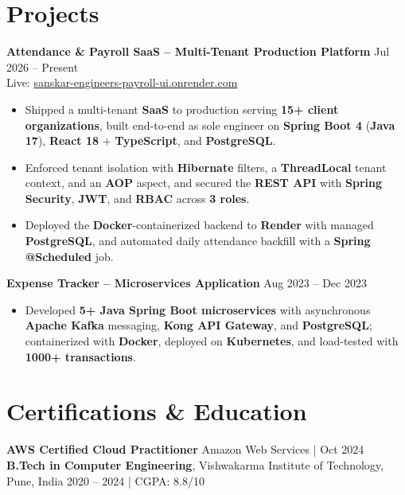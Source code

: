 \documentclass[a4paper,10pt]{article}
\begin{document}
\section*{Projects}

\textbf{Attendance \& Payroll SaaS -- Multi-Tenant Production Platform} \hfill Jul 2026 -- Present \\
Live: \href{https://sanskar-engineers-payroll-ui.onrender.com/login}{sanskar-engineers-payroll-ui.onrender.com}
\begin{itemize}[leftmargin=*]
    \item Shipped a multi-tenant \textbf{SaaS} to production serving \textbf{15+ client organizations}, built end-to-end as sole engineer on \textbf{Spring Boot 4} (\textbf{Java 17}), \textbf{React 18} + \textbf{TypeScript}, and \textbf{PostgreSQL}.
    \item Enforced tenant isolation with \textbf{Hibernate} filters, a \textbf{ThreadLocal} tenant context, and an \textbf{AOP} aspect, and secured the \textbf{REST API} with \textbf{Spring Security}, \textbf{JWT}, and \textbf{RBAC} across \textbf{3 roles}.
    \item Deployed the \textbf{Docker}-containerized backend to \textbf{Render} with managed \textbf{PostgreSQL}, and automated daily attendance backfill with a \textbf{Spring @Scheduled} job.
\end{itemize}

\textbf{Expense Tracker -- Microservices Application} \hfill Aug 2023 -- Dec 2023
\begin{itemize}[leftmargin=*]
    \item Developed \textbf{5+ Java Spring Boot microservices} with asynchronous \textbf{Apache Kafka} messaging, \textbf{Kong API Gateway}, and \textbf{PostgreSQL}; containerized with \textbf{Docker}, deployed on \textbf{Kubernetes}, and load-tested with \textbf{1000+ transactions}.
\end{itemize}

\section*{Certifications \& Education}
\textbf{AWS Certified Cloud Practitioner} \hfill Amazon Web Services \;|\; Oct 2024 \\
\textbf{B.Tech in Computer Engineering}, Vishwakarma Institute of Technology, Pune, India \hfill 2020 -- 2024 \;|\; CGPA: 8.8/10
\end{document}
